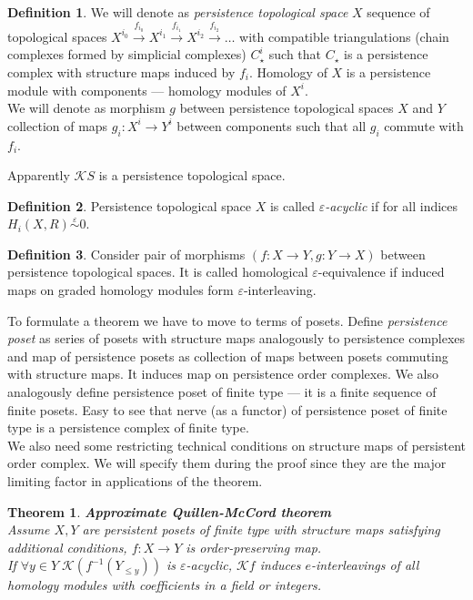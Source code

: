 \documentclass[a4paper, 12pt]{article}
\newtheorem{theorem}{Theorem}
\theoremstyle{definition}
\newtheorem{definition}{Definition}
\theoremstyle{remark}
\newcommand{\define}[1]{{\textit{#1}}}
\begin{document}
\begin{definition}
  We will denote as \define{persistence topological space} $X$ sequence of topological spaces $X^{i_0} \xrightarrow{f_{i_0}} X^{i_1} \xrightarrow{f_{i_1}} X^{i_2} \xrightarrow{f_{i_2}} \ldots$ with compatible triangulations (chain complexes formed by simplicial complexes) $C_{\star}^{i}$ such that $C_{\star}$ is a persistence complex with structure maps induced by $f_i$. Homology of $X$ is a persistence module with components --- homology modules of $X^i$.\\

  We will denote as morphism $g$ between persistence topological spaces $X$ and $Y$ collection of maps $g_i : X^i \to Y^i$ between components such that all $g_i$ commute with $f_i$.
\end{definition}

Apparently $\mathcal{K}S$ is a persistence topological space.\\

\begin{definition}
  Persistence topological space $X$ is called \define{$\varepsilon$-acyclic} if for all indices $H_i(X,R) \stackrel{\varepsilon}{\sim} 0$.
\end{definition}

\begin{definition}
  Consider pair of morphisms $(f : X \to Y, g : Y \to X)$ between persistence topological spaces. It is called homological $\varepsilon$-equivalence if induced maps on graded homology modules form $\varepsilon$-interleaving.
\end{definition}

To formulate a theorem we have to move to terms of posets. Define \define{persistence poset} as series of posets with structure maps analogously to persistence complexes and map of persistence posets as collection of maps between posets commuting with structure maps. It induces map on persistence order complexes. We also analogously define persistence poset of finite type --- it is a finite sequence of finite posets. Easy to see that nerve (as a functor) of persistence poset of finite type is a persistence complex of finite type.\\
We also need some restricting technical conditions on structure maps of persistent order complex. We will specify them during the proof since they are the major limiting factor in applications of the theorem.

\begin{theorem} \textbf{Approximate Quillen-McCord theorem}\\
  Assume $X, Y$ are persistent posets of finite type with structure maps satisfying additional conditions, $f : X \to Y$ is order-preserving map.\\
  If $\forall y \in Y\;\mathcal{K}(f^{-1}(Y_{\leqslant y}))$ is $\varepsilon$-acyclic, $\mathcal{K}f$ induces $e$-interleavings of all homology modules with coefficients in a field or integers.\\
\end{theorem}
\end{document}

